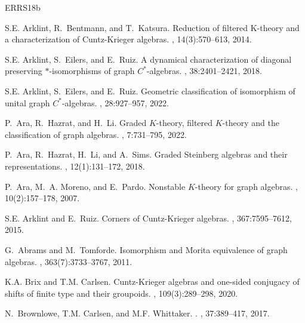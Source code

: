 \documentclass[12pt]{amsbook}%
\theoremstyle{defin}
\theoremstyle{remark}
\numberwithin{equation}{chapter}
\numberwithin{theor}{section}
\begin{document}
\newcommand{\etalchar}[1]{$^{#1}$}
\begin{thebibliography}{ERRS18b}

S.E. Arklint, R.~Bentmann, and T.~Katsura.
\newblock Reduction of filtered {K}-theory and a characterization of
  {C}untz-{K}rieger algebras.
, 14(3):570--613, 2014.

S.E. Arklint, S.~Eilers, and E.~Ruiz.
\newblock A dynamical characterization of diagonal preserving $*$-isomorphisms
  of graph {$C^*$}-algebras.
, 38:2401--2421, 2018.

S.E. Arklint, S.~Eilers, and E.~Ruiz.
\newblock Geometric classification of isomorphism of unital graph
  {$C^*$}-algebras.
, 28:927--957, 2022.

P.~Ara, R.~Hazrat, and H.~Li.
\newblock Graded {$K$}-theory, filtered {$K$}-theory and the classification of
  graph algebras.
, 7:731--795, 2022.

P.~Ara, R.~Hazrat, H.~Li, and A.~Sims.
\newblock Graded {S}teinberg algebras and their representations.
, 12(1):131--172, 2018.

P.~Ara, M.~A. Moreno, and E.~Pardo.
\newblock Nonstable {$K$}-theory for graph algebras.
, 10(2):157--178, 2007.

S.E. Arklint and E.~Ruiz.
\newblock Corners of {Cuntz-K}rieger algebras.
, 367:7595--7612, 2015.

G.~Abrams and M.~Tomforde.
\newblock Isomorphism and {M}orita equivalence of graph algebras.
, 363(7):3733--3767, 2011.

K.A. Brix and T.M. Carlsen.
\newblock Cuntz-{K}rieger algebras and one-sided conjugacy of shifts of finite
  type and their groupoids.
, 109(3):289--298, 2020.

N.~Brownlowe, T.M. Carlsen, and M.F. {Whittaker}.
.
, 37:389--417, 2017.


\end{thebibliography}
\end{document}
